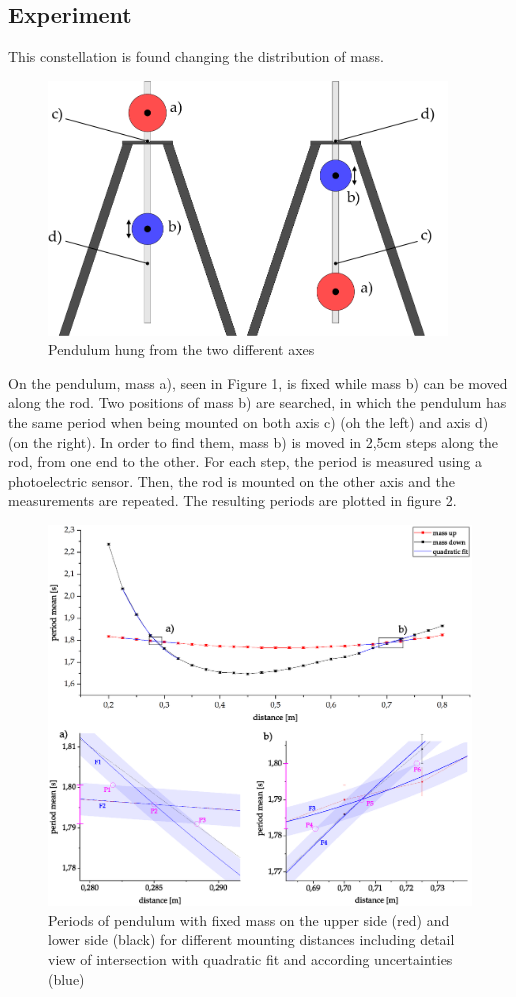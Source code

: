 \documentclass{article}
\begin{document}
\subsection{Experiment}
This constellation is found changing the distribution of mass.
\begin{figure}
\centering
\includegraphics[width=300pt]{Reversionspendel.png}
\caption{Pendulum hung from the two different axes \cite{1}}
\end{figure}
On the pendulum, mass a), seen in Figure 1, is fixed while mass b) can be moved along the rod.
Two positions of mass b) are searched, in which the pendulum has the same period when being mounted on both axis c) (oh the left) and axis d) (on the right).
In order to find them, mass b) is moved in 2,5cm steps along the rod, from one end to the other.
For each step, the period is measured using a photoelectric sensor.
Then, the rod is mounted on the other axis and the measurements are repeated.
The resulting periods are plotted in figure 2.
\begin{figure}
\centering
\includegraphics[width=450pt]{periodVsDistance.eps}
\caption{Periods of pendulum with fixed mass on the upper side (red) and lower side (black) for different mounting distances including detail view of intersection with quadratic fit and according uncertainties (blue)}
\end{figure}
\end{document}
